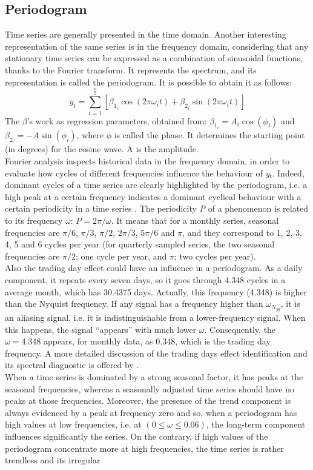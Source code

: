 \documentclass[english,blauw]{cbsdiscussionpaper}
\begin{document}
\subsection{Periodogram}
Time series are generally presented in the time domain. Another interesting representation of the same series is in the frequency domain, considering that any stationary time series can be expressed as a combination of sinusoidal functions, thanks to the Fourier transform. It represents the spectrum, and its representation is called the periodogram. It is possible to obtain it as follows:
\begin{equation}
y_t = \sum\limits_{i=1}^{\frac{n}{2}}[\beta_{1_{i}}\cos(2\pi\omega_{i}t) + \beta_{2_{i}}\sin(2\pi\omega_{i}t)]
\end{equation}
The $\beta$'s work as regression parameters, obtained from: $\beta_{1_{i}}=A_{i} \cos(\phi_{i})$ and $\beta_{2_{i}}=-A \sin(\phi_{i})$, where $\phi$ is called the phase. It determines the starting point (in degrees) for the cosine wave. A is the amplitude.\\Fourier analysis inspects historical data in the frequency domain, in order to evaluate how cycles of different frequencies influence the behaviour of \textit{y$_t$}. Indeed, dominant cycles of a time series are clearly highlighted by the periodogram, i.e. a high peak at a certain frequency indicates a dominant cyclical behaviour with a certain periodicity in a time series . The periodicity \textit{P} of a phenomenon is related to its frequency $\omega$: $P=2 \pi / \omega$. It means that for a monthly series, seasonal frequencies are $\pi/6$, $\pi/3$, $\pi/2$, $2\pi/3$, $5\pi/6$ and $\pi$, and they correspond to 1, 2, 3, 4, 5 and 6 cycles per year (for quarterly sampled series, the two seasonal frequencies are $\pi/2$; one cycle per year, and $\pi$; two cycles per year).\\Also the trading day effect could have an influence in a periodogram. As a daily component, it repeats every seven days, so it goes through 4.348 cycles in a average month, which has 30.4375 days. Actually, this frequency (4.348) is higher than the Nyquist frequency. If any signal has a frequency higher than $\omega_{N_{yq}}$, it is an aliasing signal, i.e. it is indistinguishable from a lower-frequency signal. When this happens, the signal “appears” with much lower $\omega$. Consequently, the $\omega=4.348$ appears, for monthly data, as 0.348, which is the trading day frequency. A more detailed discussion of the trading days effect identification and its spectral diagnostic is offered by \citep{fineal1999}.\\When a time series is dominated by a strong seasonal factor, it has peaks at the seasonal frequencies, whereas a seasonally adjusted time series should have no peaks at those frequencies. Moreover, the presence of the trend component is always evidenced by a peak at frequency zero and so, when a periodogram has high values at low frequencies, i.e. at $(0 \leq \omega \leq 0.06)$, the long-term component influences significantly the series. On the contrary, if high values of the periodogram concentrate more at high frequencies, the time series is rather trendless and its irregular 
\end{document}
